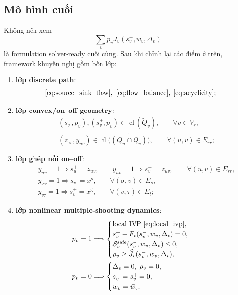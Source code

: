 \documentclass[12pt]{article}
\begin{document}
\subsection{Mô hình cuối}
Không nên xem
\[
\sum_v p_v J_v(s_v^-,w_v,\Delta_v)
\]
là formulation solver-ready cuối cùng. Sau khi chỉnh lại các điểm ở trên, framework khuyến nghị gồm bốn lớp:
\begin{enumerate}
    \item \textbf{lớp discrete path}:
    \begin{align*}
    & \eqref{eq:source_sink_flow},\ \eqref{eq:flow_balance},\ \eqref{eq:acyclicity};
    \end{align*}
    \item \textbf{lớp convex/on--off geometry}:
    \begin{align*}
    & (s_v^-,p_v),(s_v^+,p_v) \in \operatorname{cl}(\widetilde{Q}_v),\qquad \forall v\in V_r,\\
    & (z_{uv},y_{uv})\in \operatorname{cl}\!\bigl(\widetilde{(Q_u\cap Q_v)}\bigr),\qquad \forall (u,v)\in E_{rr};
    \end{align*}
    \item \textbf{lớp ghép nối on--off}:
    \begin{align*}
    & y_{uv}=1 \Longrightarrow s_u^+=z_{uv},\qquad y_{uv}=1 \Longrightarrow s_v^-=z_{uv},
    \qquad \forall (u,v)\in E_{rr},\\
    & y_{\sigma v}=1 \Longrightarrow s_v^-=x^{\mathrm s},\qquad \forall (\sigma,v)\in E_s,\\
    & y_{v\tau}=1 \Longrightarrow s_v^+=x^{\mathrm g},\qquad \forall (v,\tau)\in E_t;
    \end{align*}
    \item \textbf{lớp nonlinear multiple-shooting dynamics}:
    \begin{align*}
    & p_v=1 \Longrightarrow
    \begin{cases}
    \text{local IVP } \eqref{eq:local_ivp},\\
    s_v^+ - F_v(s_v^-,w_v,\Delta_v)=0,\\
    \mathcal S_v^{\mathrm{safe}}(s_v^-,w_v,\Delta_v)\le 0,\\
    \rho_v \ge \widehat J_v(s_v^-,w_v,\Delta_v),
    \end{cases}
    \\
    & p_v=0 \Longrightarrow
    \begin{cases}
    \Delta_v=0,\ \rho_v=0,\\
    s_v^- = s_v^+ = 0,\\
    w_v=\bar w_v.
    \end{cases}
    \end{align*}
\end{enumerate}
\end{document}
